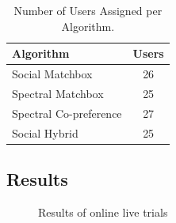 \begin{table}[h!]
\centering
\begin{tabular}{| l | c |}
\hline
{\bf Algorithm} & {\bf Users} \\
\hline
Social Matchbox & 26\\
Spectral Matchbox  & 25 \\
Spectral Co-preference & 27 \\
Social Hybrid & 25 \\
\hline
\end{tabular}
\caption{Number of Users Assigned per Algorithm.}
\end{table}

\subsection{Results}

\begin{figure}[h!]
\centering
{}
\caption{Results of online live trials}
\end{figure}


